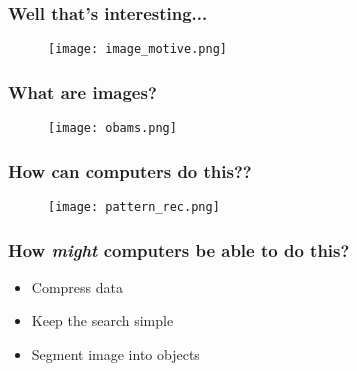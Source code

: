 \documentclass[xcolor={dvipsnames}]{beamer}
\begin{document}
\frame
{
 \frametitle{Well that's interesting...}

\begin{figure}
\centering
\texttt{[image: image\_motive.png]}
\end{figure}

}


\frame
{
 \frametitle{What are images?}

\begin{figure}
\centering
\texttt{[image: obams.png]}
\end{figure}

}

\frame
{
 \frametitle{How can computers do this??}
 
 \begin{figure}
\centering
\texttt{[image: pattern\_rec.png]}
\end{figure}

}

\frame
{
 \frametitle{How \emph{might} computers be able to do this?}
 
\Huge

 \begin{itemize}
\item<2-> Compress data
\item<2-> Keep the search simple
\item<2-> Segment image into objects
 \end{itemize}

}
\end{document}
